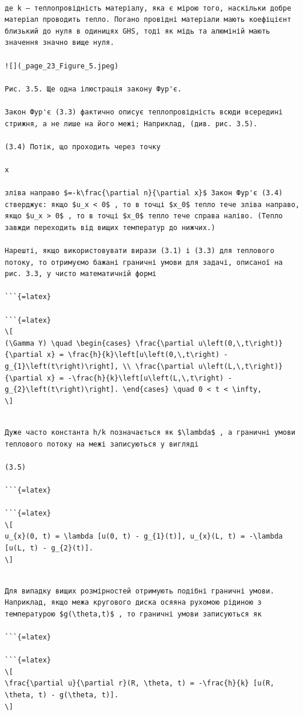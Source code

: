 \documentclass[
  ukrainian,
]{article}
\begin{document}
\begin{verbatim}

де k — теплопровідність матеріалу, яка є мірою того, наскільки добре матеріал проводить тепло. Погано провідні матеріали мають коефіцієнт близький до нуля в одиницях GHS, тоді як мідь та алюміній мають значення значно вище нуля.

![](_page_23_Figure_5.jpeg)

Рис. 3.5. Ще одна ілюстрація закону Фур'є.

Закон Фур'є (3.3) фактично описує теплопровідність всюди всередині стрижня, а не лише на його межі; Наприклад, (див. рис. 3.5).

(3.4) Потік, що проходить через точку

x

зліва направо $=-k\frac{\partial n}{\partial x}$ Закон Фур'є (3.4) стверджує: якщо $u_x < 0$ , то в точці $x_0$ тепло тече зліва направо, якщо $u_x > 0$ , то в точці $x_0$ тепло тече справа наліво. (Тепло завжди переходить від вищих температур до нижчих.)

Нарешті, якщо використовувати вирази (3.1) і (3.3) для теплового потоку, то отримуємо бажані граничні умови для задачі, описаної на рис. 3.3, у чисто математичній формі

```{=latex}

```{=latex}
\[
(\Gamma Y) \quad \begin{cases} \frac{\partial u\left(0,\,t\right)}{\partial x} = \frac{h}{k}\left[u\left(0,\,t\right) - g_{1}\left(t\right)\right], \\ \frac{\partial u\left(L,\,t\right)}{\partial x} = -\frac{h}{k}\left[u\left(L,\,t\right) - g_{2}\left(t\right)\right]. \end{cases} \quad 0 < t < \infty,
\]
\end{verbatim}

\begin{verbatim}

Дуже часто константа h/k позначається як $\lambda$ , а граничні умови теплового потоку на межі записуються у вигляді

(3.5)

```{=latex}

```{=latex}
\[
u_{x}(0, t) = \lambda [u(0, t) - g_{1}(t)], u_{x}(L, t) = -\lambda [u(L, t) - g_{2}(t)].
\]
\end{verbatim}

\begin{verbatim}

Для випадку вищих розмірностей отримують подібні граничні умови. Наприклад, якщо межа кругового диска осяяна рухомою рідиною з температурою $g(\theta,t)$ , то граничні умови записуються як

```{=latex}

```{=latex}
\[
\frac{\partial u}{\partial r}(R, \theta, t) = -\frac{h}{k} [u(R, \theta, t) - g(\theta, t)].
\]
\end{verbatim}
\end{document}
